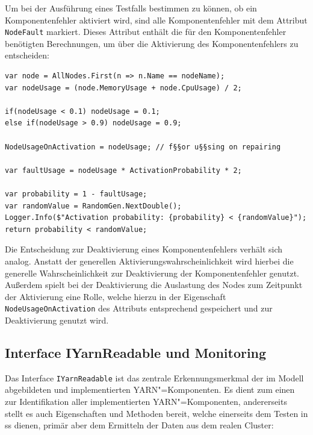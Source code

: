 Um bei der Ausführung eines Testfalls bestimmen zu können, ob ein Komponentenfehler aktiviert wird, sind alle Komponentenfehler mit dem Attribut \texttt{NodeFault} markiert.
Dieses Attribut enthält die für den Komponentenfehler benötigten Berechnungen, um über die Aktivierung des Komponentenfehlers zu entscheiden:

\begin{lstlisting}[label=lst:faultActivationCalc,style=cs,
caption={[Berechnung der Aktivierung von Komponentenfehlern]
    Berechnung der Aktivierung von Komponentenfehlern (zusammengefasst).}]
var node = AllNodes.First(n => n.Name == nodeName);
var nodeUsage = (node.MemoryUsage + node.CpuUsage) / 2;

if(nodeUsage < 0.1) nodeUsage = 0.1;
else if(nodeUsage > 0.9) nodeUsage = 0.9;

NodeUsageOnActivation = nodeUsage; // f§§or u§§sing on repairing

var faultUsage = nodeUsage * ActivationProbability * 2;

var probability = 1 - faultUsage;
var randomValue = RandomGen.NextDouble();
Logger.Info($"Activation probability: {probability} < {randomValue}");
return probability < randomValue;
\end{lstlisting}

Die Entscheidung zur Deaktivierung eines Komponentenfehlers verhält sich analog.
Anstatt der generellen Aktivierungswahrscheinlichkeit wird hierbei die generelle Wahrscheinlichkeit zur Deaktivierung der Komponentenfehler genutzt.
Außerdem spielt bei der Deaktivierung die Auslastung des Nodes zum Zeitpunkt der Aktivierung eine Rolle, welche hierzu in der Eigenschaft \texttt{NodeUsageOnActivation} des Attributs entsprechend gespeichert und zur Deaktivierung genutzt wird.

\subsection{Interface IYarnReadable und Monitoring}
\label{subsec:yarnComponentInterface}

Das Interface \texttt{IYarnReadable} ist das zentrale Erkennungsmerkmal der im Modell abgebildeten und implementierten YARN"=Komponenten.
Es dient zum einen zur Identifikation aller implementierten YARN"=Komponenten, andererseits stellt es auch Eigenschaften und Methoden bereit, welche einerseits dem Testen in \gls{ss} dienen, primär aber dem Ermitteln der Daten aus dem realen Cluster:

